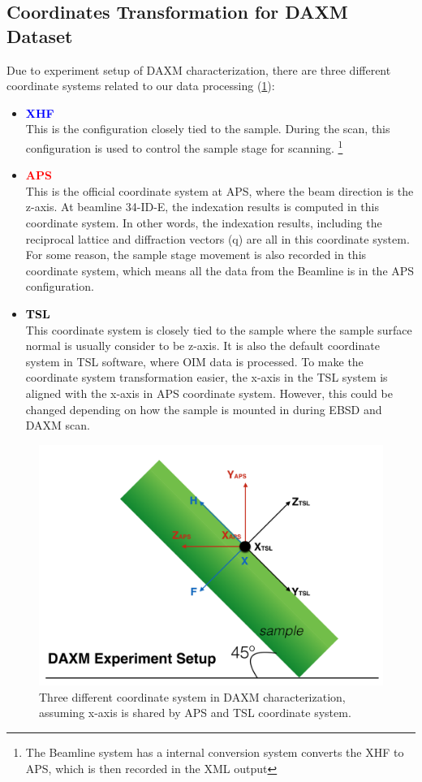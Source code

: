\documentclass[12pt]{scrartcl}
\begin{document}
\subsection{Coordinates Transformation for DAXM Dataset}
\label{sec:coord}
Due to experiment setup of DAXM characterization, there are three different coordinate systems related to our data processing (\cref{fig:daxmcoord}):
\begin{itemize}
\item \textcolor{blue}{\textbf{XHF}} \\
This is the configuration closely tied to the sample.
During the scan, this configuration is used to control the sample stage for scanning. 
\footnote{The Beamline system has a internal conversion system converts the XHF to APS, which is then recorded in the XML output}

\item \textcolor{red}{\textbf{APS}} \\
This is the official coordinate system at APS, where the beam direction is the z-axis.
At beamline 34-ID-E, the indexation results is computed in this coordinate system.
In other words, the indexation results, including the reciprocal lattice and diffraction vectors (\tnsr q) are all in this coordinate system.
For some reason, the sample stage movement is also recorded in this coordinate system, which means all the data from the Beamline is in the APS configuration.

\item \textcolor{black}{\textbf{TSL}} \\
This coordinate system is closely tied to the sample where the sample surface normal is usually consider to be z-axis.
It is also the default coordinate system in TSL software, where OIM data is processed.
To make the coordinate system transformation easier, the x-axis in the TSL system is aligned with the x-axis in APS coordinate system.
However, this could be changed depending on how the sample is mounted in during EBSD and DAXM scan.

\end{itemize}

\begin{figure}[htp]
\centering
\includegraphics[width=.7\linewidth]{daxmcoord.png}
\caption{Three different coordinate system in DAXM characterization, assuming x-axis is shared by APS and TSL coordinate system.}
\label{fig:daxmcoord}
\end{figure}
\end{document}
